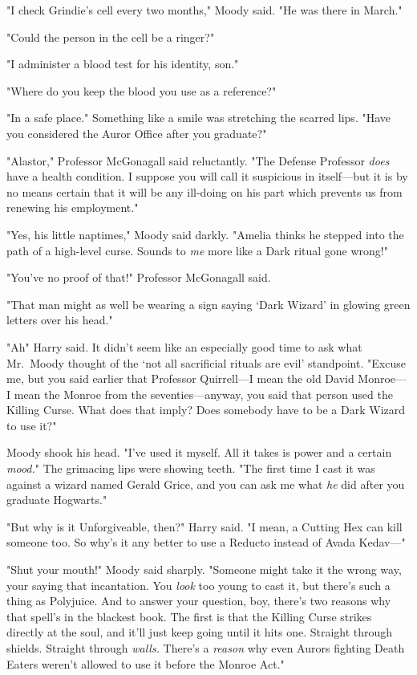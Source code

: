 "I check Grindie's cell every two months," Moody said. "He was there in March."

"Could the person in the cell be a ringer?"

"I administer a blood test for his identity, son."

"Where do you keep the blood you use as a reference?"

"In a safe place." Something like a smile was stretching the scarred lips.
"Have you considered the Auror Office after you graduate?"

"Alastor," Professor McGonagall said reluctantly. "The Defense Professor
\emph{does} have a{\el} health condition. I suppose you will call it
suspicious in itself—but it is by no means certain that it will be any
ill-doing on his part which prevents us from renewing his employment."

"Yes, his little naptimes," Moody said darkly. "Amelia thinks he stepped into
the path of a high-level curse. Sounds to \emph{me} more like a Dark ritual
gone wrong!"

"You've no proof of that!" Professor McGonagall said.

"That man might as well be wearing a sign saying `Dark Wizard' in glowing green
letters over his head."

"Ah{\el}" Harry said. It didn't seem like an especially good time to ask
what Mr.~Moody thought of the `not all sacrificial rituals are evil'
standpoint. "Excuse me, but you said earlier that Professor Quirrell—I mean
the old David Monroe—I mean the Monroe from the seventies—anyway, you said
that person used the Killing Curse. What does that imply? Does somebody have to
be a Dark Wizard to use it?"

Moody shook his head. "I've used it myself. All it takes is power and a certain
\emph{mood.}" The grimacing lips were showing teeth. "The first time I cast it
was against a wizard named Gerald Grice, and you can ask me what \emph{he} did
after you graduate Hogwarts."

"But why is it Unforgiveable, then?" Harry said. "I mean, a Cutting Hex can
kill someone too. So why's it any better to use a Reducto instead of Avada
Kedav—"

"Shut your mouth!" Moody said sharply. "Someone might take it the wrong way,
your saying that incantation. You \emph{look} too young to cast it, but there's
such a thing as Polyjuice. And to answer your question, boy, there's two
reasons why that spell's in the blackest book. The first is that the Killing
Curse strikes directly at the soul, and it'll just keep going until it hits
one. Straight through shields. Straight through \emph{walls.} There's a
\emph{reason} why even Aurors fighting Death Eaters weren't allowed to use it
before the Monroe Act."

